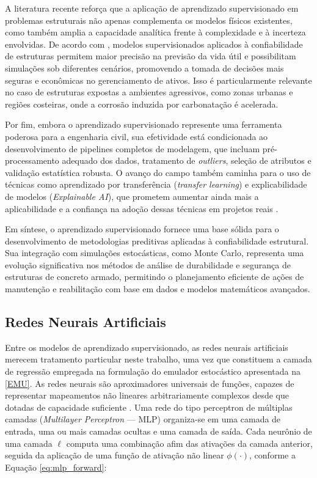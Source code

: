 A literatura recente reforça que a aplicação de aprendizado supervisionado em problemas estruturais não apenas complementa os modelos físicos existentes, como também amplia a capacidade analítica frente à complexidade e à incerteza envolvidas. De acordo com \textcite{zhang_machine_2025}, modelos supervisionados aplicados à confiabilidade de estruturas permitem maior precisão na previsão da vida útil e possibilitam simulações sob diferentes cenários, promovendo a tomada de decisões mais seguras e econômicas no gerenciamento de ativos. Isso é particularmente relevante no caso de estruturas expostas a ambientes agressivos, como zonas urbanas e regiões costeiras, onde a corrosão induzida por carbonatação é acelerada.

Por fim, embora o aprendizado supervisionado represente uma ferramenta poderosa para a engenharia civil, sua efetividade está condicionada ao desenvolvimento de pipelines completos de modelagem, que incluam pré-processamento adequado dos dados, tratamento de \textit{outliers}, seleção de atributos e validação estatística robusta. O avanço do campo também caminha para o uso de técnicas como aprendizado por transferência (\textit{transfer learning}) e explicabilidade de modelos (\textit{Explainable AI}), que prometem aumentar ainda mais a aplicabilidade e a confiança na adoção dessas técnicas em projetos reais \cite{flah_machine_2021, zhang_machine_2025}.

Em síntese, o aprendizado supervisionado fornece uma base sólida para o desenvolvimento de metodologias preditivas aplicadas à confiabilidade estrutural. Sua integração com simulações estocásticas, como Monte Carlo, representa uma evolução significativa nos métodos de análise de durabilidade e segurança de estruturas de concreto armado, permitindo o planejamento eficiente de ações de manutenção e reabilitação com base em dados e modelos matemáticos avançados.
\subsection{Redes Neurais Artificiais} \label{RNA}

Entre os modelos de aprendizado supervisionado, as redes neurais artificiais merecem tratamento particular neste trabalho, uma vez que constituem a camada de regressão empregada na formulação do emulador estocástico apresentada na \autoref{EMU}. As redes neurais são aproximadores universais de funções, capazes de representar mapeamentos não lineares arbitrariamente complexos desde que dotadas de capacidade suficiente \cite{goodfellow2016}. Uma rede do tipo perceptron de múltiplas camadas (\textit{Multilayer Perceptron} --- MLP) organiza-se em uma camada de entrada, uma ou mais camadas ocultas e uma camada de saída. Cada neurônio de uma camada $\ell$ computa uma combinação afim das ativações da camada anterior, seguida da aplicação de uma função de ativação não linear $\phi(\cdot)$, conforme a Equação \eqref{eq:mlp_forward}:

